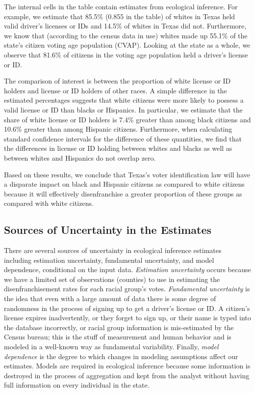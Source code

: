 \documentclass[12pt]{article}
\begin{document}
The internal cells in the table contain estimates from ecological
inference. For example, we estimate that 85.5\% (0.855 in the table)
of whites in Texas held valid driver's licenses or IDs and 14.5\% of
whites in Texas did not.  Furthermore, we know that (according to the
census data in use) whites made up 55.1\% of the state's citizen voting
age population (CVAP).  Looking at the state as a whole, we observe
that 81.6\% of citizens in the voting age population held a driver's
license or ID.

The comparison of interest is between the proportion of white license
or ID holders and license or ID holders of other races. A simple
difference in the estimated percentages suggests that white citizens
were more likely to possess a valid license or ID than blacks or
Hispanics. In particular, we estimate that the share of white license
or ID holders is 7.4\% greater than among black citizens and 10.6\%
greater than among Hispanic citizens. Furthermore, when calculating
standard confidence intervals for the difference of these quantities,
we find that the differences in license or ID holding between whites
and blacks as well as between whites and Hispanics do not overlap
zero.

Based on these results, we conclude that Texas's voter identification law will have a disparate impact on black and Hispanic citizens as compared to white citizens because it will effectively disenfranchise a greater proportion of these groups as compared with white citizens.

\subsection{Sources of Uncertainty in the Estimates}

There are several sources of uncertainty in ecological inference
estimates including estimation uncertainty, fundamental uncertainty,
and model dependence, conditional on the input data.  \emph{Estimation
  uncertainty} occurs because we have a limited set of observations
(counties) to use in estimating the disenfranchisement rates for each
racial group's votes.  \emph{Fundamental uncertainty} is the idea that
even with a large amount of data there is some degree of randomness in
the process of signing up to get a driver's license or ID.  A
citizen's license expires inadvertently, or they forget to sign up, or
their name is typed into the database incorrectly, or racial group
information is mis-estimated by the Census bureau; this is the stuff
of measurement and human behavior and is modeled in a well-known way
as fundamental variability. Finally, \emph{model dependence} is the
degree to which changes in modeling assumptions affect our estimates.
Models are required in ecological inference because some information
is destroyed in the process of aggregation and kept from the analyst
without having full information on every individual in the state.
\end{document}

